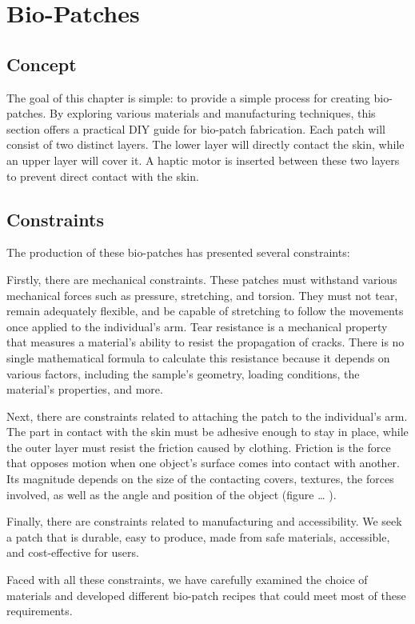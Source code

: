 \section{Bio-Patches}
\subsection{Concept}
The goal of this chapter is simple: to provide a simple process for creating bio-patches. By exploring various materials and manufacturing techniques, this section offers a practical DIY guide for bio-patch fabrication. Each patch will consist of two distinct layers. The lower layer will directly contact the skin, while an upper layer will cover it. A haptic motor is inserted between these two layers to prevent direct contact with the skin. 

\subsection{Constraints}
The production of these bio-patches has presented several constraints:

Firstly, there are mechanical constraints. These patches must withstand various mechanical forces such as pressure, stretching, and torsion. They must not tear, remain adequately flexible, and be capable of stretching to follow the movements once applied to the individual's arm. Tear resistance is a mechanical property that measures a material's ability to resist the propagation of cracks. There is no single mathematical formula to calculate this resistance because it depends on various factors, including the sample's geometry, loading conditions, the material's properties, and more.

Next, there are constraints related to attaching the patch to the individual's arm. The part in contact with the skin must be adhesive enough to stay in place, while the outer layer must resist the friction caused by clothing. Friction is the force that opposes motion when one object's surface comes into contact with another. Its magnitude depends on the size of the contacting covers, textures, the forces involved, as well as the angle and position of the object (figure … ).

Finally, there are constraints related to manufacturing and accessibility. We seek a patch that is durable, easy to produce, made from safe materials, accessible, and cost-effective for users.

Faced with all these constraints, we have carefully examined the choice of materials and developed different bio-patch recipes that could meet most of these requirements.

